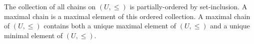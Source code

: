The collection of all chains on $(U, \leq)$ is partially-ordered by set-inclusion. A maximal chain is a maximal element of this ordered collection. A maximal chain of $(U, \leq)$ contains both a unique maximal element of $(U, \leq)$ and a unique minimal element of $(U, \leq)$.
